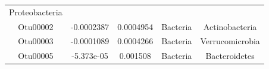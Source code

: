 \documentclass[]{article}
\begin{document}
\begin{longtable}[]{@{}ccccc@{}}
\begin{minipage}[t]{0.27\columnwidth}
Proteobacteria\strut
\end{minipage}\tabularnewline
\begin{minipage}[t]{0.13\columnwidth}\centering\strut
Otu00002\strut
\end{minipage} & \begin{minipage}[t]{0.16\columnwidth}\centering\strut
-0.0002387\strut
\end{minipage} & \begin{minipage}[t]{0.14\columnwidth}\centering\strut
0.0004954\strut
\end{minipage} & \begin{minipage}[t]{0.13\columnwidth}\centering\strut
Bacteria\strut
\end{minipage} & \begin{minipage}[t]{0.27\columnwidth}\centering\strut
Actinobacteria\strut
\end{minipage}\tabularnewline
\begin{minipage}[t]{0.13\columnwidth}\centering\strut
Otu00003\strut
\end{minipage} & \begin{minipage}[t]{0.16\columnwidth}\centering\strut
-0.0001089\strut
\end{minipage} & \begin{minipage}[t]{0.14\columnwidth}\centering\strut
0.0004266\strut
\end{minipage} & \begin{minipage}[t]{0.13\columnwidth}\centering\strut
Bacteria\strut
\end{minipage} & \begin{minipage}[t]{0.27\columnwidth}\centering\strut
Verrucomicrobia\strut
\end{minipage}\tabularnewline
\begin{minipage}[t]{0.13\columnwidth}\centering\strut
Otu00005\strut
\end{minipage} & \begin{minipage}[t]{0.16\columnwidth}\centering\strut
-5.373e-05\strut
\end{minipage} & \begin{minipage}[t]{0.14\columnwidth}\centering\strut
0.001508\strut
\end{minipage} & \begin{minipage}[t]{0.13\columnwidth}\centering\strut
Bacteria\strut
\end{minipage} & \begin{minipage}[t]{0.27\columnwidth}\centering\strut
Bacteroidetes\strut
\end{minipage}\tabularnewline

\end{longtable}
\end{document}
